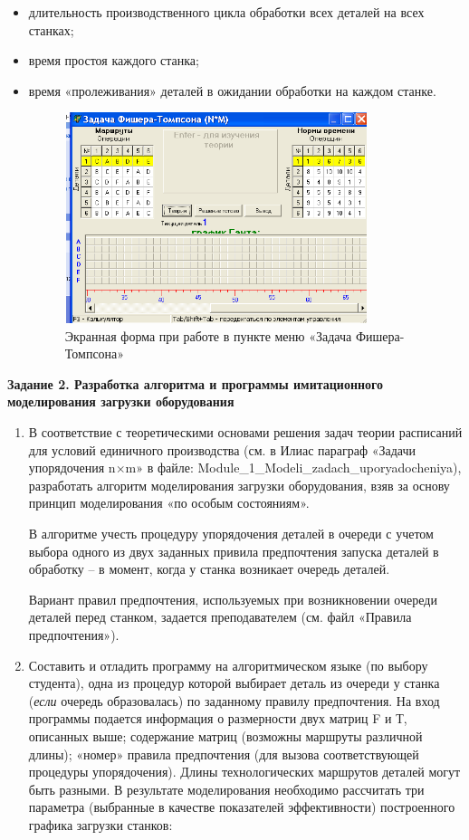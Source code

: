 \documentclass[a4paper,12pt]{article}
\begin{document}
\begin{flushleft}
\begin{enumerate}
\begin{itemize}
\item
  длительность производственного цикла обработки всех деталей на всех
  станках;
\item
  время простоя каждого станка;
\item
  время «пролеживания» деталей в ожидании обработки на каждом станке. 
\begin{flushleft}\end{flushleft}
\begin{figure}
    \includegraphics[width=8.832cm,height=6.156cm]{pic_1.png}
    \centering
    \caption{\small{Экранная форма при работе в пункте меню «Задача
    Фишера-Томпсона»}}
\end{figure}
\end{itemize}
\end{enumerate}
\raggedright
\textbf{Задание 2. Разработка алгоритма и программы имитационного
моделирования загрузки оборудования }
\justify
\begin{enumerate}
\item
  В соответствие с теоретическими основами решения задач теории
  расписаний для условий единичного производства (см. в Илиас параграф
  «Задачи упорядочения n$\times$m» в файле:
  Module\_1\_Modeli\_zadach\_uporyadocheniya), разработать алгоритм
  моделирования загрузки оборудования, взяв за основу принцип
  моделирования «по особым состояниям». 

  В алгоритме учесть процедуру упорядочения деталей в очереди с учетом
  выбора одного из двух заданных привила предпочтения запуска деталей в
  обработку -- в момент, когда у станка возникает очередь деталей.

  Вариант правил предпочтения, используемых при возникновении очереди
  деталей перед станком, задается преподавателем (см. файл «Правила
  предпочтения»).

\item
  Составить и отладить программу на алгоритмическом языке (по выбору
  студента), одна из процедур которой выбирает деталь из очереди у
  станка (\emph{если} очередь образовалась) по заданному правилу
  предпочтения. На вход программы подается информация о размерности двух
  матриц F и Т, описанных выше; содержание матриц (возможны маршруты
  различной длины); «номер» правила предпочтения (для вызова
  соответствующей процедуры упорядочения). Длины технологических
  маршрутов деталей могут быть разными. В результате моделирования
  необходимо рассчитать три параметра (выбранные в качестве показателей
  эффективности) построенного графика загрузки станков:


\end{enumerate}
\end{flushleft}
\end{document}
